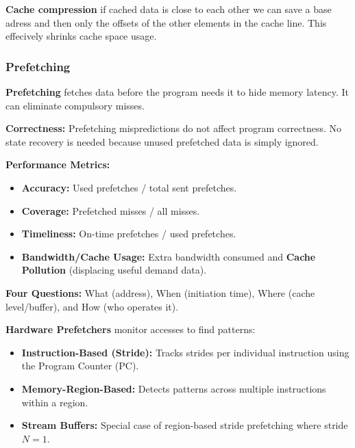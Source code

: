 \begin{remark}
	\textbf{Cache compression} if cached data is close to each other we can save a base adress and then only the offsets of the other elements in the cache line. This effecively shrinks cache space usage.
\end{remark}


\subsubsection{Prefetching}

\begin{definition}
	\textbf{Prefetching} fetches data before the program needs it to hide memory latency. It can eliminate compulsory misses.
\end{definition}

\begin{remark}
	\textbf{Correctness:} Prefetching mispredictions do not affect program correctness. No state recovery is needed because unused prefetched data is simply ignored.
\end{remark}

\begin{definition}
	\textbf{Performance Metrics:}
	\begin{itemize}
		\item \textbf{Accuracy:} Used prefetches / total sent prefetches.
		\item \textbf{Coverage:} Prefetched misses / all misses.
		\item \textbf{Timeliness:} On-time prefetches / used prefetches.
		\item \textbf{Bandwidth/Cache Usage:} Extra bandwidth consumed and \textbf{Cache Pollution} (displacing useful demand data).
	\end{itemize}
\end{definition}

\begin{remark}
	\textbf{Four Questions:} What (address), When (initiation time), Where (cache level/buffer), and How (who operates it).
\end{remark}

\begin{definition}
	\textbf{Hardware Prefetchers} monitor accesses to find patterns:
	\begin{itemize}
		\item \textbf{Instruction-Based (Stride):} Tracks strides per individual instruction using the Program Counter (PC).
		\item \textbf{Memory-Region-Based:} Detects patterns across multiple instructions within a region.
		\item \textbf{Stream Buffers:} Special case of region-based stride prefetching where stride $N=1$.
	\end{itemize}
\end{definition}

